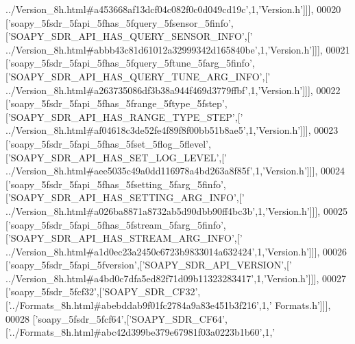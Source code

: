 \begin{DoxyCode}
{      ../Version\_8h.html#a453668af13dcf04c082f0c0d049cd19c'},1,\textcolor{stringliteral}{'Version.h'}]]],
00020   [\textcolor{stringliteral}{'soapy\_5fsdr\_5fapi\_5fhas\_5fquery\_5fsensor\_5finfo'},[\textcolor{stringliteral}{'SOAPY\_SDR\_API\_HAS\_QUERY\_SENSOR\_INFO'},[\textcolor{stringliteral}{'
      ../Version\_8h.html#abbb43c81d61012a32999342d165840be'},1,\textcolor{stringliteral}{'Version.h'}]]],
00021   [\textcolor{stringliteral}{'soapy\_5fsdr\_5fapi\_5fhas\_5fquery\_5ftune\_5farg\_5finfo'},[\textcolor{stringliteral}{'SOAPY\_SDR\_API\_HAS\_QUERY\_TUNE\_ARG\_INFO'},[\textcolor{stringliteral}{'
      ../Version\_8h.html#a263735086df3b38a944f469d3779ffbf'},1,\textcolor{stringliteral}{'Version.h'}]]],
00022   [\textcolor{stringliteral}{'soapy\_5fsdr\_5fapi\_5fhas\_5frange\_5ftype\_5fstep'},[\textcolor{stringliteral}{'SOAPY\_SDR\_API\_HAS\_RANGE\_TYPE\_STEP'},[\textcolor{stringliteral}{'
      ../Version\_8h.html#af04618c3de52fe4f89f8f00bb51b8ae5'},1,\textcolor{stringliteral}{'Version.h'}]]],
00023   [\textcolor{stringliteral}{'soapy\_5fsdr\_5fapi\_5fhas\_5fset\_5flog\_5flevel'},[\textcolor{stringliteral}{'SOAPY\_SDR\_API\_HAS\_SET\_LOG\_LEVEL'},[\textcolor{stringliteral}{'
      ../Version\_8h.html#aee5035c49a0dd116978a4bd263a8f85f'},1,\textcolor{stringliteral}{'Version.h'}]]],
00024   [\textcolor{stringliteral}{'soapy\_5fsdr\_5fapi\_5fhas\_5fsetting\_5farg\_5finfo'},[\textcolor{stringliteral}{'SOAPY\_SDR\_API\_HAS\_SETTING\_ARG\_INFO'},[\textcolor{stringliteral}{'
      ../Version\_8h.html#a026ba8871a8732ab5d90dbb90ff4bc3b'},1,\textcolor{stringliteral}{'Version.h'}]]],
00025   [\textcolor{stringliteral}{'soapy\_5fsdr\_5fapi\_5fhas\_5fstream\_5farg\_5finfo'},[\textcolor{stringliteral}{'SOAPY\_SDR\_API\_HAS\_STREAM\_ARG\_INFO'},[\textcolor{stringliteral}{'
      ../Version\_8h.html#a1d0ec23a2450c6723b9833014a632424'},1,\textcolor{stringliteral}{'Version.h'}]]],
00026   [\textcolor{stringliteral}{'soapy\_5fsdr\_5fapi\_5fversion'},[\textcolor{stringliteral}{'SOAPY\_SDR\_API\_VERSION'},[\textcolor{stringliteral}{'
      ../Version\_8h.html#a4bd0c7dfa5ed82f71d09b11323283417'},1,\textcolor{stringliteral}{'Version.h'}]]],
00027   [\textcolor{stringliteral}{'soapy\_5fsdr\_5fcf32'},[\textcolor{stringliteral}{'SOAPY\_SDR\_CF32'},[\textcolor{stringliteral}{'../Formats\_8h.html#abebddab9f01fc2784a9a83e451b3f216'},1,\textcolor{stringliteral}{'
      Formats.h'}]]],
00028   [\textcolor{stringliteral}{'soapy\_5fsdr\_5fcf64'},[\textcolor{stringliteral}{'SOAPY\_SDR\_CF64'},[\textcolor{stringliteral}{'../Formats\_8h.html#abc42d399be379e67981f03a0223b1b60'},1,\textcolor{stringliteral}{'
}
\end{DoxyCode}
